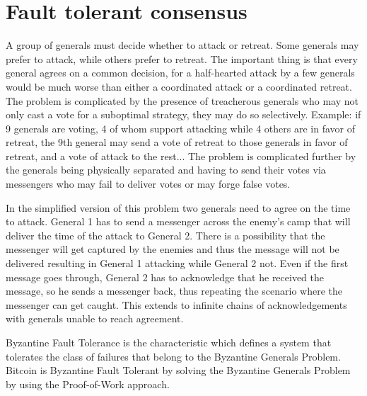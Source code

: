 \section{Fault tolerant consensus}


A group of generals must decide whether to attack or retreat. Some generals may prefer to attack, while others prefer to retreat. The important thing is that every general agrees on a common decision, for a half-hearted attack by a few generals would be much worse than either a coordinated attack or a coordinated retreat. The problem is complicated by the presence of treacherous generals who may not only cast a vote for a suboptimal strategy, they may do so selectively. Example: if 9 generals are voting, 4 of whom support attacking while 4 others are in favor of retreat, the 9th general may send a vote of retreat to those generals in favor of retreat, and a vote of attack to the rest... The problem is complicated further by the generals being physically separated and having to send their votes via messengers who may fail to deliver votes or may forge false votes.

In the simplified version of this problem two generals need to agree on the time to attack. General 1 has to send a messenger across the enemy's camp that will deliver the time of the attack to General 2. There is a possibility that the messenger will get captured by the enemies and thus the message will not be delivered resulting in General 1 attacking while General 2 not. Even if the first message goes through, General 2 has to acknowledge that he received the message, so he sends a messenger back, thus repeating the scenario where the messenger can get caught. This extends to infinite chains of acknowledgements with generals unable to reach agreement.

Byzantine Fault Tolerance is the characteristic which defines a system that tolerates the class of failures that belong to the Byzantine Generals Problem.
Bitcoin is Byzantine Fault Tolerant by solving the Byzantine Generals Problem by using the Proof-of-Work approach.